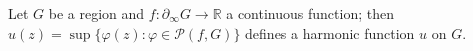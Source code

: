 Let $G$ be a region and $f: \partial_\infty G \to \mathbb{R}$ a continuous function; then $u(z) = \sup \{ \varphi(z): \varphi \in \mathcal{P}(f, G) \}$ defines a harmonic function $u$ on $G$.